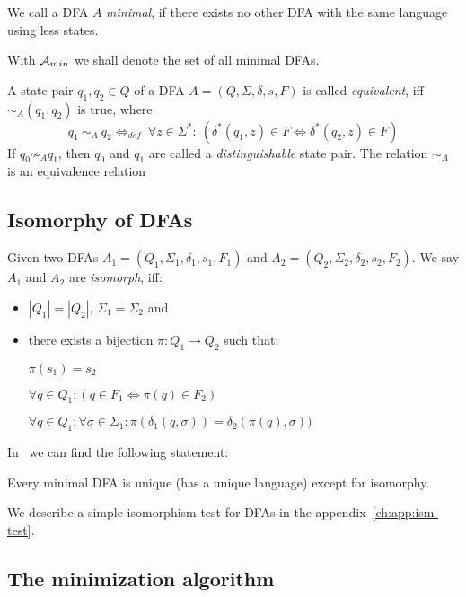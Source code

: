 \begin{definition}
	We call a DFA $A$ \emph{minimal}, if there exists no other DFA with the same language using less states.
\end{definition}
\noindent With ${\mathcal{A}_{min}}$ we shall denote the set of all minimal DFAs.

\begin{definition}\cite[p. 154]{HMU01}
	A state pair $q_1, q_2 \in Q$ of a DFA $A = (Q, \Sigma, \delta, s, F)$ is called \emph{equivalent}, iff $\sim_A(q_1, q_2)$ is true, where
	\begin{displaymath}
	q_1\ \sim_A\ q_2 \Leftrightarrow_{def}\ \forall z \in \Sigma^* \colon\ (\delta^*(q_1, z) \in F \Leftrightarrow \delta^*(q_2, z) \in F)
	\end{displaymath}
	If $q_0 \not\sim_A q_1$, then $q_0$ and $q_1$ are called a \emph{distinguishable} state pair. The relation $\sim_A$ is an equivalence relation
\end{definition}

\subsection{Isomorphy of DFAs}\label{ch:1:sec:isom}

Given two DFAs $A_1 = (Q_1, \Sigma_1, \delta_1, s_1, F_1)$ and $A_2 = (Q_2, \Sigma_2, \delta_2, s_2, F_2)$. We say $A_1$ and $A_2$ are \emph{isomorph}, iff:
\begin{itemize}
	\item $|Q_1| = |Q_2|$, $\Sigma_1 = \Sigma_2$ and
	\item there exists a bijection $\pi\colon Q_1 \to Q_2$ such that:
	
	$\pi(s_1) = s_2$
	
	$\forall q\in Q_1\colon (q\in F_1 \Longleftrightarrow \pi(q)\in F_2)$
	
	$\forall q\in Q_1\colon \forall\sigma\in\Sigma_1\colon \pi(\delta_1(q,\sigma))=\delta_2(\pi(q),\sigma))$
\end{itemize}
In~\cite[p. 45]{Sch01} we can find the following statement:
\begin{theorem}\label{ch:1:thm:uniq-ism}
	Every minimal DFA is unique (has a unique language) except for isomorphy.
\end{theorem}
\noindent We describe a simple isomorphism test for DFAs in the appendix~\ref{ch:app:ism-test}.

\subsection{The minimization algorithm}

